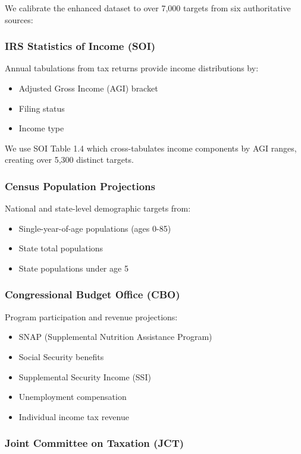 We calibrate the enhanced dataset to over 7,000 targets from six authoritative sources:

\subsubsection{IRS Statistics of Income (SOI)}

Annual tabulations from tax returns provide income distributions by:
\begin{itemize}
\item Adjusted Gross Income (AGI) bracket
\item Filing status
\item Income type
\end{itemize}

We use SOI Table 1.4 which cross-tabulates income components by AGI ranges, creating over 5,300 distinct targets.

\subsubsection{Census Population Projections}

National and state-level demographic targets from:
\begin{itemize}
\item Single-year-of-age populations (ages 0-85)
\item State total populations
\item State populations under age 5
\end{itemize}

\subsubsection{Congressional Budget Office (CBO)}

Program participation and revenue projections:
\begin{itemize}
\item SNAP (Supplemental Nutrition Assistance Program)
\item Social Security benefits
\item Supplemental Security Income (SSI)
\item Unemployment compensation
\item Individual income tax revenue
\end{itemize}

\subsubsection{Joint Committee on Taxation (JCT)}

